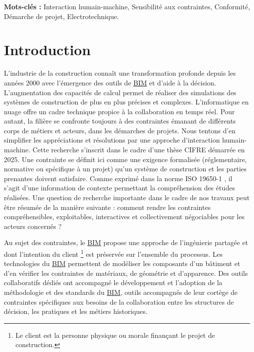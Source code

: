 \documentclass[a4paper,12pt]{article}
\newenvironment{keyword}{\begin{trivlist}\item[]{\bfseries Mots-clés :}}{\end{trivlist}}
\begin{document}
\begin{keyword}
Interaction humain-machine, Sensibilité aux contraintes, Conformité, Démarche de projet, Electrotechnique.
\end{keyword}
\section{Introduction}
\label{sec:orgcdcc8a9}
L’industrie de la construction connaît une transformation profonde depuis les années 2000 avec l’émergence des outils de \protect\hyperlink{gls-1}{\label{gls-1-use-3}BIM} et d’aide à la décision. L’augmentation des capacités de calcul permet de réaliser des simulations des systèmes de construction de plus en plus précises et complexes. L’informatique en nuage  offre un cadre technique propice à la collaboration en temps réel. Pour autant, la filière se confronte toujours à des contraintes émanant de différents corps de métiers et acteurs, dans les démarches de projets. Nous tentons d’en simplifier les appréciations et résolutions par une approche d’interaction humain-machine. Cette recherche s’inscrit dans le cadre d’une thèse CIFRE démarrée en 2025. Une contrainte se définit ici comme une exigence formalisée (réglementaire, normative ou spécifique à un projet) qu’un système de construction et les parties prenantes doivent satisfaire. Comme exprimé dans la norme ISO 19650-1 \autocite{OrganisationNumerisationInformations2018a}, il s’agit d’une information de contexte permettant la compréhension des études réalisées.  Une question de recherche importante dans le cadre de nos travaux peut être résumée de la manière suivante : comment rendre les contraintes compréhensibles, exploitables, interactives et collectivement négociables pour les acteurs concernés ?

Au sujet des contraintes, le \protect\hyperlink{gls-1}{\label{gls-1-use-4}BIM} propose une approche de l'ingénierie partagée et dont l’intention du client \footnote{Le client est la personne physique ou morale finançant le projet de construction.} est préservée sur l’ensemble du processus. Les technologies du \protect\hyperlink{gls-1}{\label{gls-1-use-5}BIM} permettent de modéliser les composants d'un bâtiment et d'en vérifier les contraintes de matériaux, de géométrie et d’apparence. Des outils collaboratifs dédiés ont accompagné le développement et l’adoption de la méthodologie et des standards du \protect\hyperlink{gls-1}{\label{gls-1-use-6}BIM}, outils accompagnés de leur cortège de contraintes spécifiques aux besoins de la collaboration entre les structures de décision, les pratiques et les métiers historiques. 
\end{document}
